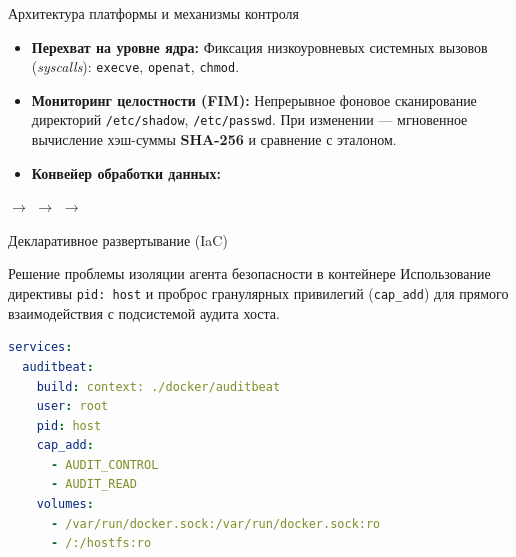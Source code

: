 \documentclass[10pt,pdftex,aspectratio=169]{beamer}
\begin{document}
\begin{frame}{Архитектура платформы и механизмы контроля}
    \begin{itemize}
        \item \textbf{Перехват на уровне ядра:} Фиксация низкоуровневых системных вызовов (\textit{syscalls}): \texttt{execve}, \texttt{openat}, \texttt{chmod}.
        \item \textbf{Мониторинг целостности (FIM):} Непрерывное фоновое сканирование директорий \texttt{/etc/shadow}, \texttt{/etc/passwd}. При изменении — мгновенное вычисление хэш-суммы \textbf{SHA-256} и сравнение с эталоном.
        \item \textbf{Конвейер обработки данных:}
    \end{itemize}
    \begin{center}
         $\longrightarrow$  $\longrightarrow$  $\longrightarrow$ 
    \end{center}
\end{frame}

\begin{frame}[fragile]{Декларативное развертывание (IaC)}
    \begin{block}{Решение проблемы изоляции агента безопасности в контейнере}
        Использование директивы \texttt{pid: host} и проброс гранулярных привилегий (\texttt{cap\_add}) для прямого взаимодействия с подсистемой аудита хоста.
    \end{block}
\begin{lstlisting}[language=yaml, caption=Фрагмент deploy/docker-compose.yml]
services:
  auditbeat:
    build: context: ./docker/auditbeat
    user: root
    pid: host
    cap_add:
      - AUDIT_CONTROL
      - AUDIT_READ
    volumes:
      - /var/run/docker.sock:/var/run/docker.sock:ro
      - /:/hostfs:ro
\end{lstlisting}
\end{frame}
\end{document}
